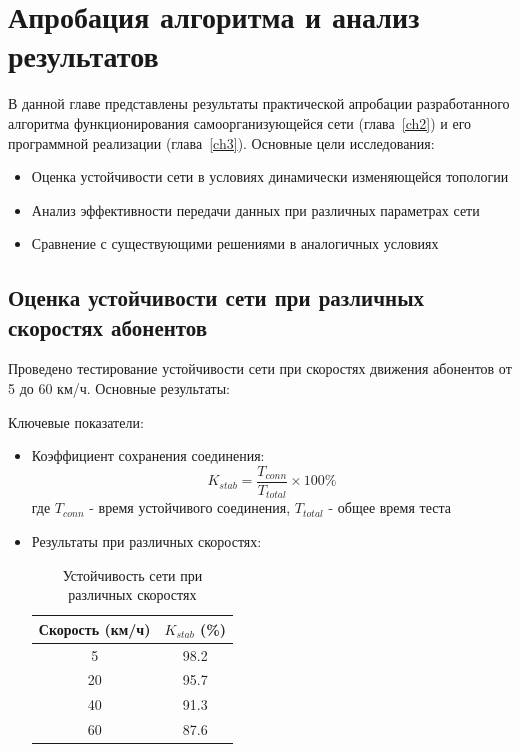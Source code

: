 \chapter{Апробация алгоритма и анализ результатов} \label{ch4}

В данной главе представлены результаты практической апробации разработанного алгоритма функционирования самоорганизующейся сети (глава~\ref{ch2}) и его программной реализации (глава~\ref{ch3}). Основные цели исследования:

\begin{itemize}
    \item Оценка устойчивости сети в условиях динамически изменяющейся топологии
    \item Анализ эффективности передачи данных при различных параметрах сети
    \item Сравнение с существующими решениями в аналогичных условиях
\end{itemize}

\section{Оценка устойчивости сети при различных скоростях абонентов} \label{ch4:sec1}

Проведено тестирование устойчивости сети при скоростях движения абонентов от 5 до 60 км/ч. Основные результаты:


Ключевые показатели:
\begin{itemize}
    \item Коэффициент сохранения соединения:
    \begin{equation}
    K_{stab} = \frac{T_{conn}}{T_{total}} \times 100\%
    \end{equation}
    где $T_{conn}$ - время устойчивого соединения, $T_{total}$ - общее время теста
    
    \item Результаты при различных скоростях:
    \begin{table}[h]
    \centering
    \begin{tabular}{|c|c|}
    \hline
    Скорость (км/ч) & $K_{stab}$ (\%) \\ \hline
    5 & 98.2 \\ \hline
    20 & 95.7 \\ \hline
    40 & 91.3 \\ \hline
    60 & 87.6 \\ \hline
    \end{tabular}
    \caption{Устойчивость сети при различных скоростях}
    \label{tab:stability}
    \end{table}
\end{itemize}

